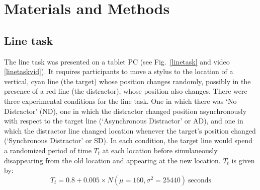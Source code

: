 \documentclass[10pt,letterpaper]{article}
\begin{document}
\section*{Materials and Methods}
\subsection*{Line task}

The line task was presented on a tablet PC (see Fig.~\ref{linetask}
and video \ref{linetaskvid}). It requires participants to move a
stylus to the location of a vertical, cyan line (the target) whose
position changes randomly, possibly in the presence of a red line (the
distractor), whose position also changes. There were three
experimental conditions for the line task. One in which there was `No
Distractor' (ND), one in which the distractor changed position
asynchronously with respect to the target line (`Asynchronous
Distractor' or AD), and one in which the distractor line changed
location whenever the target's position changed (`Synchronous
Distractor' or SD). In each condition, the target line would spend a
randomized period of time $T_t$ at each location before simulaneously
disappearing from the old location and appearing at the new
location. $T_t$ is given by:
%
\begin{equation}\label{eq:tau_distractor_sync}
  T_t = 0.8 + 0.005 \times N(\mu=160,\sigma^2=25440)~\text{seconds}
\end{equation}
%
%
%
%
%
%
\end{document}
